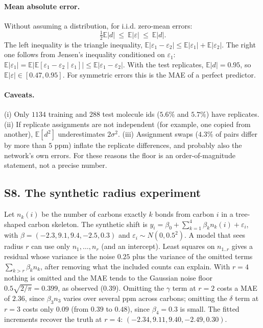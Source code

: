 \documentclass[11pt]{article}
\newcommand{\E}{\mathbb{E}}
\begin{document}
\paragraph{Mean absolute error.} Without assuming a distribution, for i.i.d. zero-mean errors:
\[
  \tfrac12\E|d|\ \le\ \E|\varepsilon|\ \le\ \E|d|.
\]
The left inequality is the triangle inequality, $\E|\varepsilon_1-\varepsilon_2|\le\E|\varepsilon_1|+\E|\varepsilon_2|$. The right one follows from Jensen's inequality conditioned on $\varepsilon_1$: $\E|\varepsilon_1|=\E\big|\E[\varepsilon_1-\varepsilon_2\mid\varepsilon_1]\big|\le\E|\varepsilon_1-\varepsilon_2|$. With the test replicates, $\E|d|=0.95$, so $\E|\varepsilon|\in[0.47,0.95]$. For symmetric errors this is the MAE of a perfect predictor.

\paragraph{Caveats.} (i) Only $1134$ training and $288$ test molecule ids ($5.6\%$ and $5.7\%$) have replicates. (ii) If replicate assignments are not independent (for example, one copied from another), $\E[d^2]$ underestimates $2\sigma^2$. (iii) Assignment swaps ($4.3\%$ of pairs differ by more than $5$ ppm) inflate the replicate differences, and probably also the network's own errors. For these reasons the floor is an order-of-magnitude statement, not a precise number.

\label{sec:S8}
\subsection*{S8. The synthetic radius experiment}
Let $n_k(i)$ be the number of carbons exactly $k$ bonds from carbon $i$ in a tree-shaped carbon skeleton. The synthetic shift is $y_i=\beta_0+\sum_{k=1}^{4}\beta_kn_k(i)+\varepsilon_i$, with $\beta=(-2.3,9.1,9.4,-2.5,0.3)$ and $\varepsilon_i\sim N(0,0.5^2)$. A model that sees radius $r$ can use only $n_1,\dots,n_r$ (and an intercept). Least squares on $n_{1..r}$ gives a residual whose variance is the noise $0.25$ plus the variance of the omitted terms $\sum_{k>r}\beta_kn_k$, after removing what the included counts can explain. With $r=4$ nothing is omitted and the MAE tends to the Gaussian noise floor $0.5\sqrt{2/\pi}=0.399$, as observed ($0.39$). Omitting the $\gamma$ term at $r=2$ costs a MAE of $2.36$, since $\beta_3n_3$ varies over several ppm across carbons; omitting the $\delta$ term at $r=3$ costs only $0.09$ (from $0.39$ to $0.48$), since $\beta_4=0.3$ is small. The fitted increments recover the truth at $r=4$: $(-2.34,9.11,9.40,-2.49,0.30)$.
\end{document}

